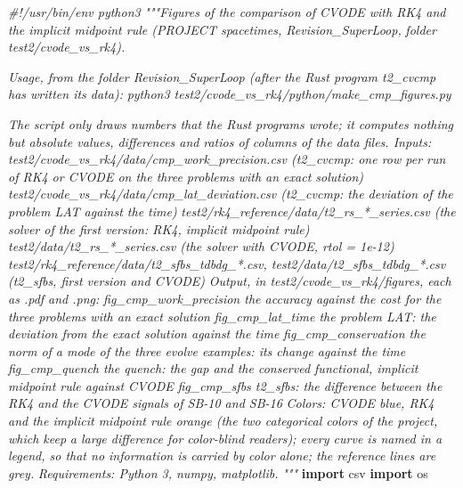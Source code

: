 \documentclass[
  10pt,
]{article}
\newenvironment{Shaded}{}{}
\newcommand{\CommentTok}[1]{\textcolor[rgb]{0.38,0.63,0.69}{\textit{#1}}}
\newcommand{\ImportTok}[1]{\textcolor[rgb]{0.00,0.50,0.00}{\textbf{#1}}}
\newcommand{\NormalTok}[1]{#1}
\begin{document}
\begin{Shaded}
\begin{Highlighting}[]
\CommentTok{\#!/usr/bin/env python3}
\CommentTok{"""Figures of the comparison of CVODE with RK4 and the implicit midpoint rule (PROJECT spacetimes, Revision\_SuperLoop,}
\CommentTok{folder test2/cvode\_vs\_rk4).}

\CommentTok{Usage, from the folder Revision\_SuperLoop (after the Rust program t2\_cvcmp has written its data):}
\CommentTok{    python3 test2/cvode\_vs\_rk4/python/make\_cmp\_figures.py}

\CommentTok{The script only draws numbers that the Rust programs wrote; it computes nothing but absolute values, differences and}
\CommentTok{ratios of columns of the data files.  Inputs:}
\CommentTok{    test2/cvode\_vs\_rk4/data/cmp\_work\_precision.csv   (t2\_cvcmp: one row per run of RK4 or CVODE on the three problems}
\CommentTok{                                                      with an exact solution)}
\CommentTok{    test2/cvode\_vs\_rk4/data/cmp\_lat\_deviation.csv    (t2\_cvcmp: the deviation of the problem LAT against the time)}
\CommentTok{    test2/rk4\_reference/data/t2\_rs\_*\_series.csv       (the solver of the first version: RK4, implicit midpoint rule)}
\CommentTok{    test2/data/t2\_rs\_*\_series.csv                     (the solver with CVODE, rtol = 1e{-}12)}
\CommentTok{    test2/rk4\_reference/data/t2\_sfbs\_tdbdg\_*.csv, test2/data/t2\_sfbs\_tdbdg\_*.csv  (t2\_sfbs, first version and CVODE)}
\CommentTok{Output, in test2/cvode\_vs\_rk4/figures, each as .pdf and .png:}
\CommentTok{    fig\_cmp\_work\_precision    the accuracy against the cost for the three problems with an exact solution}
\CommentTok{    fig\_cmp\_lat\_time          the problem LAT: the deviation from the exact solution against the time}
\CommentTok{    fig\_cmp\_conservation      the norm of a mode of the three evolve examples: its change against the time}
\CommentTok{    fig\_cmp\_quench            the quench: the gap and the conserved functional, implicit midpoint rule against CVODE}
\CommentTok{    fig\_cmp\_sfbs              t2\_sfbs: the difference between the RK4 and the CVODE signals of SB{-}10 and SB{-}16}
\CommentTok{Colors: CVODE blue, RK4 and the implicit midpoint rule orange (the two categorical colors of the project, which keep}
\CommentTok{a large difference for color{-}blind readers); every curve is named in a legend, so that no information is carried by}
\CommentTok{color alone; the reference lines are grey.}
\CommentTok{Requirements: Python 3, numpy, matplotlib.}
\CommentTok{"""}
\ImportTok{import}\NormalTok{ csv}
\ImportTok{import}\NormalTok{ os}


\end{Highlighting}
\end{Shaded}
\end{document}

